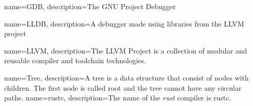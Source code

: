 {
    name=GDB,
    description={The GNU Project Debugger}
}

{
    name=LLDB,
    description={A debugger made using libraries from the LLVM project}
}

{
    name=LLVM,
    description={The LLVM Project is a collection of modular and reusable compiler and toolchain technologies.}
}

{
    name=Tree,
    description={A tree is a data structure that consist of nodes with children. The first node is called root and the tree cannot have any circular paths.}
}
{
    name=rustc,
    description={The name of the \emph{rust} compiler is rustc.}
}













